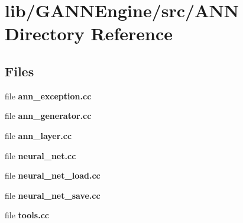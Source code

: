 \section{lib/\+G\+A\+N\+N\+Engine/src/\+A\+N\+N Directory Reference}
\label{dir_b69c91f7186fff81ba732c96be72730a}
\subsection*{Files}
\begin{DoxyCompactItemize}
\item 
file {\bfseries ann\+\_\+exception.\+cc}
\item 
file {\bfseries ann\+\_\+generator.\+cc}
\item 
file {\bfseries ann\+\_\+layer.\+cc}
\item 
file {\bfseries neural\+\_\+net.\+cc}
\item 
file {\bfseries neural\+\_\+net\+\_\+load.\+cc}
\item 
file {\bfseries neural\+\_\+net\+\_\+save.\+cc}
\item 
file {\bfseries tools.\+cc}
\end{DoxyCompactItemize}
